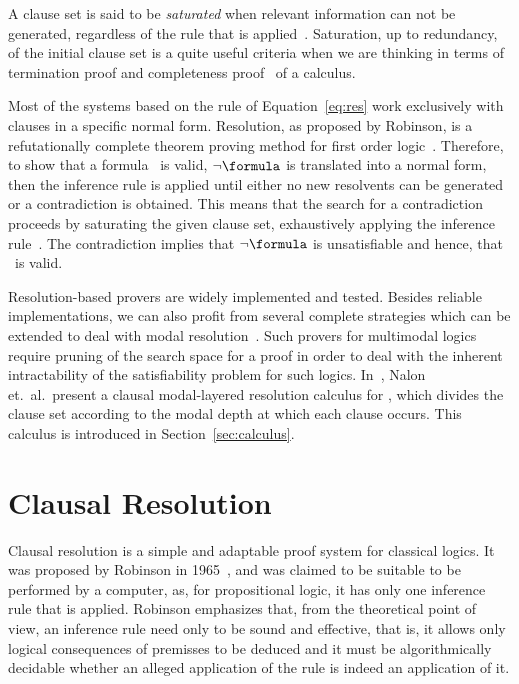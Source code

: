 A clause set is said to be \emph{saturated} when relevant information can not be
generated, regardless of the rule that is applied~\cite{dershowitz2003abstract}.
Saturation, up to redundancy, of the initial clause set is a quite useful
criteria when we are thinking in terms of
termination proof and completeness proof~\cite{fitting} of a calculus.

Most of the systems based on the rule of Equation~\ref{eq:res} work exclusively
with clauses in a specific normal form. Resolution, as proposed by Robinson, is
a refutationally complete theorem proving method for first order
logic~\cite{Robinson65}.  Therefore, to show that a formula \formula~is valid,
$\neg \formula$ is translated into a normal form, then the inference rule is
applied until either no new resolvents can be generated or a contradiction is
obtained. This means that the search for a contradiction proceeds by saturating
the given clause set, exhaustively applying the inference
rule~\cite{bachmair2001resolution}. The contradiction implies that $\neg
\formula$ is unsatisfiable and hence, that \formula~is valid. 

Resolution-based provers are widely implemented and tested. Besides reliable
implementations, we can also profit from several complete strategies which can
be extended to deal with modal resolution~\cite{journals/jal/NalonD07}. Such
provers for multimodal logics require pruning of the search space for a proof in
order to deal with the inherent intractability of the satisfiability problem for
such logics. In~\cite{nalon2015modal}, Nalon et.\ al.\ present a clausal
modal-layered resolution calculus for , which divides the clause
set according to the modal depth at which each clause occurs. This calculus is
introduced in Section~\ref{sec:calculus}.

\section{Clausal Resolution}

Clausal resolution is a simple and adaptable proof system for classical logics.
It was proposed by Robinson in 1965~\cite{Robinson65}, and was claimed to be
suitable to be performed by a computer, as, for propositional logic, it has only
one inference rule that is applied. Robinson emphasizes that, from the
theoretical point of view, an inference rule need only to be sound and
effective, that is, it allows only logical consequences of premisses to be
deduced and it must be algorithmically decidable whether an alleged application
of the rule is indeed an application of it.

